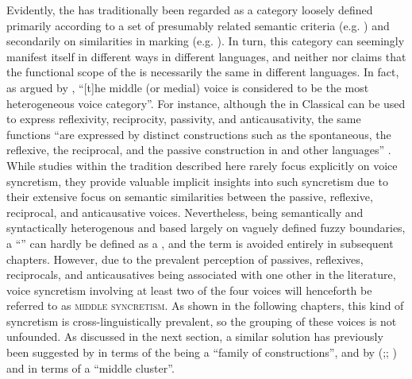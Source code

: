 Evidently, the  has traditionally been regarded as a category loosely defined primarily according to a set of presumably related semantic criteria (e.g. \citealt[238]{kemmer:1993}) and secondarily on similarities in marking (e.g. \citealt[15ff.]{kemmer:1993}). In turn, this category can seemingly manifest itself in different ways in different languages, and neither \citeauthor{klaiman:1991} nor \citeauthor{kemmer:1993} claims that the functional scope of the  is necessarily the same in different languages. In fact, as argued by \cite[1149]{shibatani:2004}, “[t]he middle (or medial) voice is considered to be the most heterogeneous voice category”. For instance, although the  in Classical  can be used to express reflexivity, reciprocity, passivity, and anticausativity, the same functions “are expressed by distinct constructions such as the spontaneous, the reflexive, the reciprocal, and the passive construction in  and other languages” \citep[1157]{shibatani:2004}. While studies within the tradition described here rarely focus explicitly on voice syncretism, they provide valuable implicit insights into such syncretism due to their extensive focus on semantic similarities between the passive, reflexive, reciprocal, and anticausative voices. Nevertheless, being semantically and syntactically heterogenous and based largely on vaguely defined fuzzy boundaries, a “” can hardly be defined as a , and the term is avoided entirely in subsequent chapters. However, due to the prevalent perception of passives, reflexives, reciprocals, and anticausatives being associated with one other in the literature, voice syncretism involving at least two of the four voices will henceforth be referred to as \textsc{middle syncretism}. As shown in the following chapters, this kind of syncretism is cross-linguistically prevalent, so the grouping of these voices is not unfounded. As discussed in the next section, a similar solution has previously been suggested by \citet{shibatani:2004} in terms of the  being a “family of constructions”, and by \citeauthor{kulikov:2010} (\citeyear[394f.]{kulikov:2010};; \citeyear[265ff.]{kulikov:2013}) and \citet[175ff.]{zuniga:kittila:2019} in terms of a “middle cluster”. 

